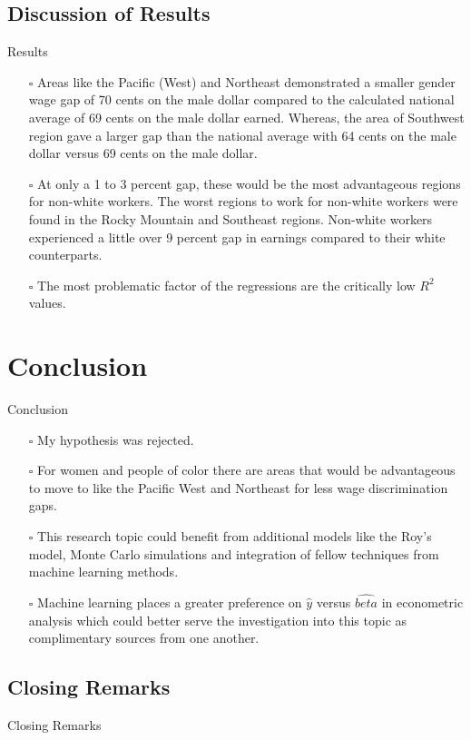 \documentclass[9pt]{beamer}
\begin{document}
\subsection{Discussion of Results}
\begin{frame}{Results}
\begin{itemize}
\setlength\itemsep{1em}
    \item[$\square$] Areas like the Pacific (West) and Northeast demonstrated a smaller gender wage gap of 70 cents on the male dollar compared to the calculated national average of 69 cents on the male dollar earned. Whereas, the area of Southwest region gave a larger gap than the national average with 64 cents on the male dollar versus 69 cents on the male dollar.
    \item[$\square$]   At only a 1 to 3 percent gap, these would be the most advantageous regions for non-white workers. The worst regions to work for non-white workers were found in the Rocky Mountain and Southeast regions. Non-white workers experienced a little over 9 percent gap in earnings compared to their white counterparts.
    \item[$\square$] The most problematic factor of the regressions are the critically low \begin{math} R^2 \end{math} values.
\end{itemize}
\end{frame}

\section{Conclusion}
\begin{frame}{Conclusion}
\begin{itemize}
\setlength\itemsep{1em}
    \item[$\square$] My hypothesis was rejected.
    \item[$\square$] For women and people of color there are areas that would be advantageous to move to like the Pacific West and Northeast for less wage discrimination gaps. 
    \item[$\square$] This research topic could benefit from additional models like the Roy's model, Monte Carlo simulations and integration of fellow techniques from machine learning methods.
    \item[$\square$]  Machine learning places a greater preference on \begin{math} \hat{y} \end{math} versus \begin{math} \hat{beta} \end{math} in econometric analysis which could better serve the investigation into this topic as complimentary sources from one another.
\end{itemize}
\end{frame}

\subsection{Closing Remarks}
\begin{frame}{Closing Remarks}
\huge
    \newline
    \newline
\huge
    \boldsymbol{!}
\end{frame}
\end{document}

